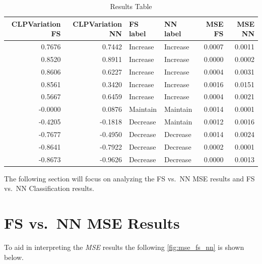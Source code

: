 \documentclass[titlepage]{article}
\begin{document}
\begin{table}[H]
    \centering
    \begin{tabular}{rrllrr}
        \toprule
        CLPVariation FS & CLPVariation NN & FS label & NN label & MSE FS & MSE NN \\
        \midrule
        0.7676          & 0.7442          & Increase & Increase & 0.0007 & 0.0011 \\
        0.8520          & 0.8911          & Increase & Increase & 0.0000 & 0.0002 \\
        0.8606          & 0.6227          & Increase & Increase & 0.0004 & 0.0031 \\
        0.8561          & 0.3420          & Increase & Increase & 0.0016 & 0.0151 \\
        0.5667          & 0.6459          & Increase & Increase & 0.0004 & 0.0021 \\
        -0.0000         & 0.0876          & Maintain & Maintain & 0.0014 & 0.0001 \\
        -0.4205         & -0.1818         & Decrease & Maintain & 0.0012 & 0.0016 \\
        -0.7677         & -0.4950         & Decrease & Decrease & 0.0014 & 0.0024 \\
        -0.8641         & -0.7922         & Decrease & Decrease & 0.0002 & 0.0001 \\
        -0.8673         & -0.9626         & Decrease & Decrease & 0.0000 & 0.0013 \\
        \bottomrule
    \end{tabular}    \caption{Results Table}
    \label{tab:final_results}
\end{table}

The following section will focus on analyzing the FS vs.\ NN MSE results and FS vs.\ NN Classification results.

\section{FS vs.\ NN MSE Results}
To aid in interpreting the \emph{MSE} results the following \cref{fig:mse_fs_nn} is shown below.
\end{document}
